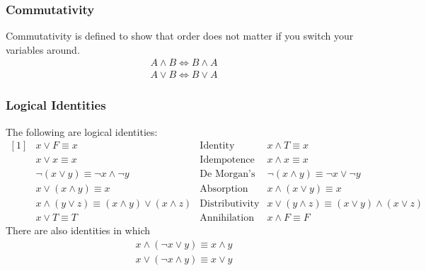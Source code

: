 \documentclass[a4paper]{article}
\theoremstyle{plain}
\theoremstyle{definition}
\theoremstyle{remark}
\begin{document}
\subsubsection{Commutativity}
Commutativity is defined to show that order does not matter if you switch your variables around.
\begin{align*}
	A \land B \iff B \land A \\
	A \lor B \iff B \lor A
\end{align*}
\subsubsection{Logical Identities}
The following are logical identities:
\[
	\begin{matrix*}[1]
&x \lor F \equiv x &\text{Identity} & x \land T \equiv x\\
&x \lor x \equiv x & \text{Idempotence} & x \land x \equiv x\\
&\neg\left( x \lor y \right) \equiv \neg x \land \neg y & \text{De Morgan's Laws} & \neg \left( x \land y \right) \equiv \neg x \lor \neg y\\
&x \lor \left( x \land y \right) \equiv x & \text{Absorption} & x \land \left( x \lor y \right) \equiv x\\
& x \land \left( y \lor z \right) \equiv (x \land y) \lor \left( x \land z \right) & \text{Distributivity} & x \lor (y \land z) \equiv (x \lor y) \land (x \lor z)\\
& x \lor T \equiv T & \text{Annihilation} & x \land F \equiv F
	\end{matrix*}
\]
There are also identities in which
\begin{align*}
	x \land (\neg x \lor y) \equiv x \land y \\
	x \lor (\neg x \land y ) \equiv x \lor y
\end{align*}
\end{document}
